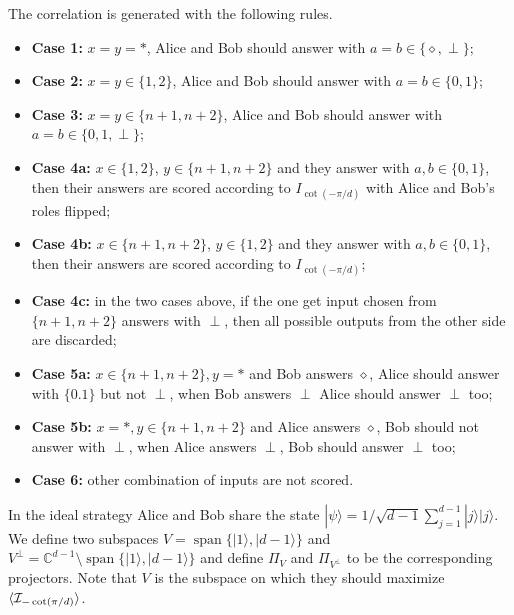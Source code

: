 \documentclass[11pt,letterpaper]{article}
\newcommand{\ket}[1]{|#1\rangle}
\DeclarePairedDelimiter{\ip}{\langle}{\rangle}
\DeclareMathOperator{\spn}{span}
\newcommand{\C}{\mathbb{C}}
\newcommand{\1}{\mathbb{1}}
\newcommand{\I}{\mathcal{I}}
\theoremstyle{definition}
\begin{document}
The correlation is generated with the following rules.
\begin{itemize}
	\item \textbf{Case 1:} $x = y = \ast$, Alice and Bob should answer with $a = b \in \{\diamond, \perp\}$;
	\item \textbf{Case 2:} $x = y \in \{1,2\}$, Alice and Bob should answer with $a = b \in \{0, 1\}$;
	\item \textbf{Case 3:} $x = y \in \{n+1, n+2\}$, Alice and Bob should answer with $a = b \in \{0, 1, \perp\}$;
	\item \textbf{Case 4a:} $x \in \{1,2\}$, $y \in \{n+1, n+2\}$ and they answer with $a,b \in \{0,1\}$, then
	their answers are scored according to $I_{\cot(-\pi/d)}$ with Alice and Bob's roles flipped;
	\item \textbf{Case 4b:} $x \in \{n+1, n+2\}$, $y \in \{1,2\}$ and they answer with $a,b \in \{0,1\}$, then
	their answers are scored according to $I_{\cot(-\pi/d)}$;
	\item \textbf{Case 4c:} in the two cases above, if the one get input chosen from $\{n+1,n+2\}$ answers
	 with $\perp$, then all possible outputs from the other side are discarded;
	\item \textbf{Case 5a:} $x \in \{n+1,n+2\}, y = \ast$ and Bob answers $\diamond$, Alice should answer with $\{0.1\}$ but not $\perp$, when Bob answers $\perp$ Alice should answer $\perp$ too;
	\item \textbf{Case 5b:} $x = \ast, y \in \{n+1, n+2\}$ and Alice answers $\diamond$, Bob should not answer with $\perp$,
	when Alice answers $\perp$, Bob should answer $\perp$ too;
	\item \textbf{Case 6:} other combination of inputs are not scored.
\end{itemize}
In the ideal strategy Alice and Bob share the state $\ket{\psi} =1/\sqrt{d-1} \sum_{j=1}^{d-1} \ket{j}\ket{j}$.
We define two subspaces $V = \spn\{\ket{1}, \ket{d-1}\}$ and $V^\perp = \C^{d-1} \setminus\spn\{\ket{1}, \ket{d-1}\}$ and
define $\Pi_V$ and $\Pi_{V^\perp}$ to be the corresponding projectors. Note that $V$ is the subspace on which they should maximize $\ip{\I_{-\cot(\pi/d)}}$.
\end{document}
